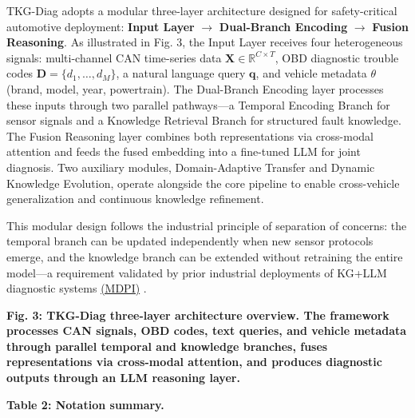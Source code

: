 \documentclass[
  11pt,
]{article}
\begin{document}
TKG-Diag adopts a modular three-layer architecture designed for
safety-critical automotive deployment: \textbf{Input Layer}
\(\rightarrow\) \textbf{Dual-Branch Encoding} \(\rightarrow\)
\textbf{Fusion Reasoning}. As illustrated in Fig. 3, the Input Layer
receives four heterogeneous signals: multi-channel CAN time-series data
\(\mathbf{X} \in \mathbb{R}^{C \times T}\), OBD diagnostic trouble codes
\(\mathbf{D} = \{d_1, \ldots, d_M\}\), a natural language query
\(\mathbf{q}\), and vehicle metadata \(\theta\) (brand, model, year,
powertrain). The Dual-Branch Encoding layer processes these inputs
through two parallel pathways---a Temporal Encoding Branch for sensor
signals and a Knowledge Retrieval Branch for structured fault knowledge.
The Fusion Reasoning layer combines both representations via cross-modal
attention and feeds the fused embedding into a fine-tuned LLM for joint
diagnosis. Two auxiliary modules, Domain-Adaptive Transfer and Dynamic
Knowledge Evolution, operate alongside the core pipeline to enable
cross-vehicle generalization and continuous knowledge refinement.

This modular design follows the industrial principle of separation of
concerns: the temporal branch can be updated independently when new
sensor protocols emerge, and the knowledge branch can be extended
without retraining the entire model---a requirement validated by prior
industrial deployments of KG+LLM diagnostic systems
\href{https://www.mdpi.com/2079-9292/14/21/4180}{(MDPI)} .

\textbf{Fig. 3: TKG-Diag three-layer architecture overview. The
framework processes CAN signals, OBD codes, text queries, and vehicle
metadata through parallel temporal and knowledge branches, fuses
representations via cross-modal attention, and produces diagnostic
outputs through an LLM reasoning layer.}

\textbf{Table 2: Notation summary.}
\end{document}
